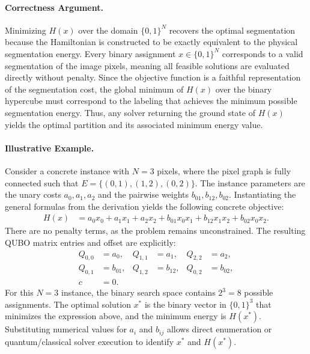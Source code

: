 \documentclass[12pt]{article}
\begin{document}
\paragraph{Correctness Argument.}
Minimizing $H(x)$ over the domain $\{0,1\}^N$ recovers the optimal segmentation because the Hamiltonian is constructed to be exactly equivalent to the physical segmentation energy. Every binary assignment $x \in \{0,1\}^N$ corresponds to a valid segmentation of the image pixels, meaning all feasible solutions are evaluated directly without penalty. Since the objective function is a faithful representation of the segmentation cost, the global minimum of $H(x)$ over the binary hypercube must correspond to the labeling that achieves the minimum possible segmentation energy. Thus, any solver returning the ground state of $H(x)$ yields the optimal partition and its associated minimum energy value.

\paragraph{Illustrative Example.}
Consider a concrete instance with $N = 3$ pixels, where the pixel graph is fully connected such that $E = \{(0,1), (1,2), (0,2)\}$. The instance parameters are the unary costs $a_0, a_1, a_2$ and the pairwise weights $b_{01}, b_{12}, b_{02}$. Instantiating the general formulas from the derivation yields the following concrete objective:
\begin{align}
  H(x) &= a_0 x_0 + a_1 x_1 + a_2 x_2 + b_{01} x_0 x_1 + b_{12} x_1 x_2 + b_{02} x_0 x_2.
\end{align}
There are no penalty terms, as the problem remains unconstrained. The resulting QUBO matrix entries and offset are explicitly:
\begin{align}
  Q_{0,0} &= a_0, & Q_{1,1} &= a_1, & Q_{2,2} &= a_2, \\
  Q_{0,1} &= b_{01}, & Q_{1,2} &= b_{12}, & Q_{0,2} &= b_{02}, \\
  c &= 0.
\end{align}
For this $N=3$ instance, the binary search space contains $2^3 = 8$ possible assignments. The optimal solution $x^*$ is the binary vector in $\{0,1\}^3$ that minimizes the expression above, and the minimum energy is $H(x^*)$. Substituting numerical values for $a_i$ and $b_{ij}$ allows direct enumeration or quantum/classical solver execution to identify $x^*$ and $H(x^*)$.
\end{document}
